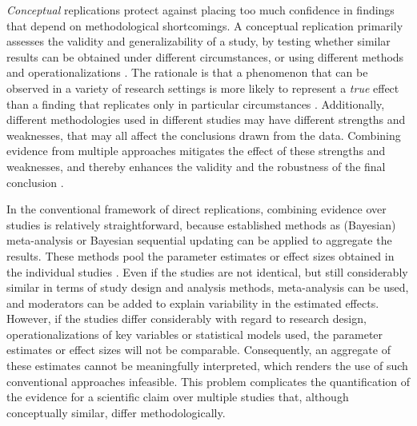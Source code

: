 \documentclass[review, 3p, authoryear]{elsarticle} %
\begin{document}
\emph{Conceptual} replications protect against placing too much confidence in findings that depend on methodological shortcomings.
A conceptual replication primarily assesses the validity and generalizability of a study, by testing whether similar results can be obtained under different circumstances, or using different methods and operationalizations \citep{nosek_scientific_2012}.
The rationale is that a phenomenon that can be observed in a variety of research settings is more likely to represent a \emph{true} effect than a finding that replicates only in particular circumstances \citep{crandall_conceptual_2016}.
Additionally, different methodologies used in different studies may have different strengths and weaknesses, that may all affect the conclusions drawn from the data.
Combining evidence from multiple approaches mitigates the effect of these strengths and weaknesses, and thereby enhances the validity and the robustness of the final conclusion \citep{lawlor_triangulation_2017, lipton2003inference, mathison1988triangulate, munafo_robust_2018, nosek_scientific_2012}.

In the conventional framework of direct replications, combining evidence over studies is relatively straightforward, because established methods as (Bayesian) meta-analysis \citep{lipsey_wilson_2001, sutton_bayesian_meta2001} or Bayesian sequential updating \citep{schonbrodt_sequential_2017} can be applied to aggregate the results.
These methods pool the parameter estimates or effect sizes obtained in the individual studies \citep{cooper_handbook_2009}.
Even if the studies are not identical, but still considerably similar in terms of study design and analysis methods, meta-analysis can be used, and moderators can be added to explain variability in the estimated effects.
However, if the studies differ considerably with regard to research design, operationalizations of key variables or statistical models used, the parameter estimates or effect sizes will not be comparable.
Consequently, an aggregate of these estimates cannot be meaningfully interpreted, which renders the use of such conventional approaches infeasible.
This problem complicates the quantification of the evidence for a scientific claim over multiple studies that, although conceptually similar, differ methodologically.
\end{document}
